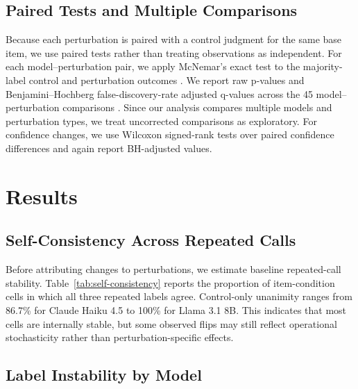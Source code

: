 \documentclass[11pt]{article}
\begin{document}
\subsection{Paired Tests and Multiple Comparisons}

Because each perturbation is paired with a control judgment for the same base item, we use paired tests rather than treating observations as independent. For each model--perturbation pair, we apply McNemar's exact test to the majority-label control and perturbation outcomes \cite{mcnemar1947note}. We report raw p-values and Benjamini--Hochberg false-discovery-rate adjusted q-values across the 45 model--perturbation comparisons \cite{benjamini1995controlling}. Since our analysis compares multiple models and perturbation types, we treat uncorrected comparisons as exploratory. For confidence changes, we use Wilcoxon signed-rank tests over paired confidence differences and again report BH-adjusted values.

\section{Results}

\subsection{Self-Consistency Across Repeated Calls}

Before attributing changes to perturbations, we estimate baseline repeated-call stability. Table~\ref{tab:self-consistency} reports the proportion of item-condition cells in which all three repeated labels agree. Control-only unanimity ranges from 86.7\% for Claude Haiku 4.5 to 100\% for Llama 3.1 8B. This indicates that most cells are internally stable, but some observed flips may still reflect operational stochasticity rather than perturbation-specific effects.

\begin{table}[H]
\centering
\small

\caption{Repeated-call self-consistency by model. Unanimity is the share of item-condition cells where all three repeated labels match.}
\label{tab:self-consistency}
\end{table}

\subsection{Label Instability by Model}
\end{document}
